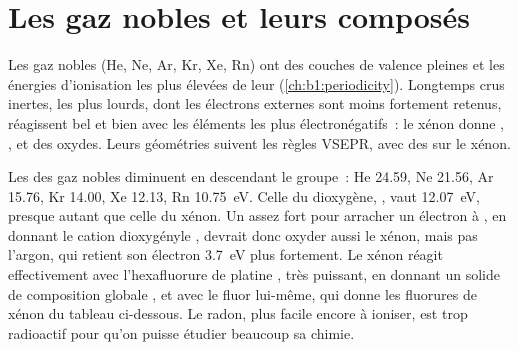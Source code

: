\section{Les gaz nobles et leurs composés}

Les gaz nobles (He, Ne, Ar, Kr, Xe, Rn) ont des couches de valence
pleines et les énergies d'ionisation les plus élevées de leur 
(\cref{ch:b1:periodicity}). Longtemps crus inertes, les plus lourds,
dont les électrons externes sont moins fortement retenus, réagissent
bel et bien avec les éléments les plus électronégatifs~: le xénon donne
, ,  et des oxydes. Leurs géométries suivent
les règles VSEPR, avec des  sur le xénon.

\begin{example}
Les  des gaz nobles diminuent en
descendant le groupe~: He
24.59, Ne 21.56, Ar 15.76, Kr 14.00, Xe 12.13, Rn 10.75~eV. Celle du
dioxygène, , vaut 12.07~eV, presque autant que celle
du xénon. Un  assez fort pour arracher un électron à , en
donnant le cation dioxygényle , devrait donc oxyder aussi le
xénon, mais pas l'argon, qui retient son électron 3.7~eV plus
fortement. Le xénon réagit effectivement avec l'hexafluorure de platine
,  très puissant, en donnant un solide de composition
globale , et avec le fluor lui-même, qui donne les fluorures
de xénon du tableau ci-dessous. Le radon, plus facile encore à ioniser,
est trop radioactif pour qu'on puisse étudier beaucoup sa chimie.
\end{example}


